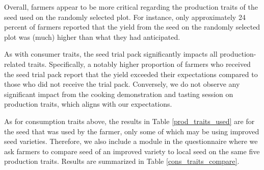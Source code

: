 \documentclass[english]{article}\usepackage[]{graphicx}\usepackage[]{xcolor}
\begin{document}
Overall, farmers appear to be more critical regarding the production
traits of the seed used on the randomly selected plot. For instance,
only approximately 24
percent of farmers reported that the yield from the seed on the randomly
selected plot was (much) higher than what they had anticipated.

As with consumer traits, the seed trial pack significantly impacts
all production-related traits. Specifically, a notably higher proportion
of farmers who received the seed trial pack report that the yield
exceeded their expectations compared to those who did not receive
the trial pack. Conversely, we do not observe any significant impact
from the cooking demonstration and tasting session on production traits,
which aligns with our expectations.

As for consumption traits above, the results in Table \ref{prod_traits_used}
are for the seed that was used by the farmer, only some of which may
be using improved seed varieties. Therefore, we also include a module
in the questionnaire where we ask farmers to compare seed of an improved
variety to local seed on the same five production traits. Results
are summarized in Table \ref{cons_traits_compare}.
\end{document}
